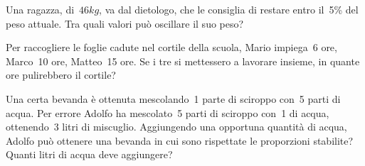 \begin{multicols}{2}
\begin{esercizio}%
 Una ragazza, di~$46\unit{kg}$, va dal dietologo, che
le consiglia di restare entro il~5\% del peso attuale. Tra
quali valori può oscillare il suo peso?
\end{esercizio}

\begin{esercizio}%
Per raccogliere le foglie cadute nel cortile
della scuola, Mario impiega~6 ore, Marco~10 ore,
Matteo~15 ore. Se i tre si mettessero a lavorare
insieme, in quante ore pulirebbero il cortile?
\end{esercizio}

\begin{esercizio}%
Una certa bevanda è ottenuta mescolando~1
parte di sciroppo con~5 parti di acqua. Per errore
Adolfo ha mescolato~5 parti di sciroppo con~1 di
acqua, ottenendo~3 litri di miscuglio. Aggiungendo
una opportuna quantità di acqua, Adolfo può ottenere
una bevanda in cui sono rispettate le proporzioni
stabilite? Quanti litri di acqua deve aggiungere?
\end{esercizio}
\end{multicols}
\newpage
